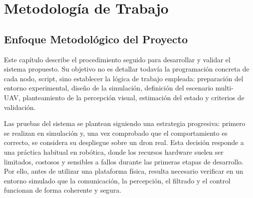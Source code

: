 \clearpage

\chapter*{Metodología de Trabajo}

\vspace{-1.5cm} 
\noindent\HRule\par\vspace{0.1cm}

\section{Enfoque Metodológico del Proyecto}

Este capítulo describe el procedimiento seguido para desarrollar y validar el sistema propuesto. Su objetivo no es detallar todavía la programación concreta de cada nodo, script, sino establecer la lógica de trabajo empleada: preparación del entorno experimental, diseño de la simulación, definición del escenario multi-UAV, planteamiento de la percepción visual, estimación del estado y criterios de validación. 

\vspace{0.3cm}

Las pruebas del sistema se plantean siguiendo una estrategia progresiva: primero se realizan en simulación y, una vez comprobado que el comportamiento es correcto, se considera su despliegue sobre un dron real. Esta decisión responde a una práctica habitual en robótica, donde los recursos hardware suelen ser limitados, costosos y sensibles a fallos durante las primeras etapas de desarrollo. Por ello, antes de utilizar una plataforma física, resulta necesario verificar en un entorno simulado que la comunicación, la percepción, el filtrado y el control funcionan de forma coherente y segura.

